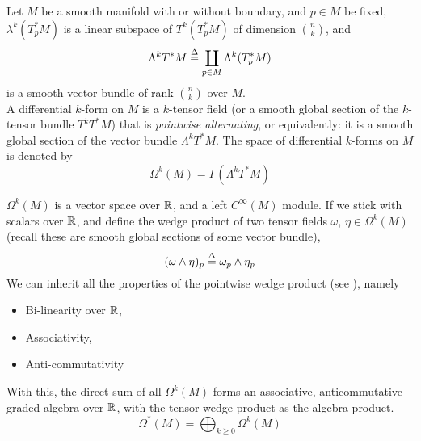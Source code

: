 \documentclass[../main-manifolds.tex]{subfiles}
\begin{document}
    \begin{definition}
        Let $M$ be a smooth manifold with or without boundary, and $p\in M$ be fixed, $\lambda^k(T_p^*M)$ is a linear subspace of $T^k(T_p^*M)$ of dimension $\binom{n}{k}$, and
        \[
            \Lambda^kT^*M \overset{\Delta}{=} \coprod_{p\in M}\Lambda ^k(T^*_p M)
        \]
        is a smooth vector bundle of rank $\binom{n}{k}$ over $M$. \\

        A differential $k$-form on $M$ is a $k$-tensor field (or a smooth global section of the $k$-tensor bundle $T^kT^*M$) that is \emph{pointwise alternating}, or equivalently: it is a smooth global section of the vector bundle $\Lambda^kT^*M$. The space of differential $k$-forms on $M$ is denoted by 
        \[
            \Omega^k(M) = \Gamma(\Lambda^kT^*M)
        \]
    \end{definition}
    \begin{definition}
        $\Omega^k(M)$ is a vector space over $\mathbb{R}$, and a left $C^\infty(M)$ module. If we stick with scalars over $\mathbb{R}$, and define the wedge product of two tensor fields $\omega$, $\eta\in \Omega^k(M)$ (recall these are smooth global sections of some vector bundle),
        \[
            (\omega\wedge\eta)_p\overset{\Delta}{=} \omega_p\wedge\eta_p
        \]
        We can inherit all the properties of the pointwise wedge product (see ), namely \begin{itemize}
            \item Bi-linearity over $\mathbb{R}$,
            \item Associativity,
            \item Anti-commutativity
        \end{itemize}
        With this, the direct sum of all $\Omega^k(M)$ forms an associative, anticommutative graded algebra over $\mathbb{R}$, with the tensor wedge product as the algebra product.
        \[
            \Omega^*(M) = \bigoplus_{k\geq 0}\Omega^k(M)
        \]
    \end{definition}
    
\end{document}
